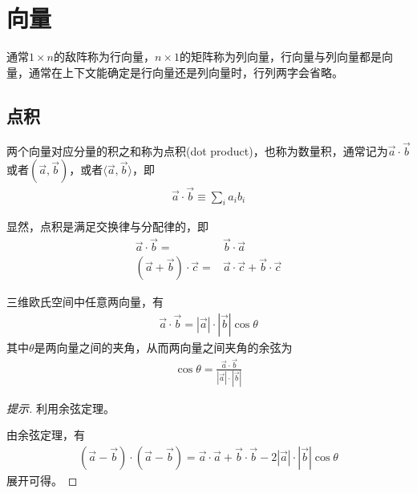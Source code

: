 \section{向量}
\label{sec:vector}

通常$1\times n$的敌阵称为行向量，$n\times 1$的矩阵称为列向量，行向量与列向量都是向量，通常在上下文能确定是行向量还是列向量时，行列两字会省略。

\subsection{点积}
\label{sec:dot-product-of-vector}
\begin{definition}
  两个向量对应分量的积之和称为点积(dot product)，也称为数量积，通常记为$\vec a\cdot\vec b$或者$(\vec a,\vec b)$，或者$\langle\vec a,\vec b\rangle$，即
  \begin{align*}
    \vec{a}\cdot \vec b\equiv\sum_i a_ib_i
  \end{align*}
\end{definition}

显然，点积是满足交换律与分配律的，即
\begin{align*}
  \vec a\cdot \vec b={}&\vec b\cdot \vec a\\
  (\vec a + \vec b)\cdot \vec c ={}& \vec a\cdot \vec c + \vec b\cdot \vec c
\end{align*}

\begin{theorem}
  三维欧氏空间中任意两向量，有
  \begin{align*}
    \vec{a}\cdot \vec b=\left|\vec a\right| \cdot \left|\vec b\right| \cos\theta
  \end{align*}
  其中$\theta$是两向量之间的夹角，从而两向量之间夹角的余弦为
  \begin{align*}
    \cos\theta = \frac{\vec a\cdot \vec b}{\left|\vec a\right| \cdot \left|\vec b\right|}
  \end{align*}
\end{theorem}
\begin{proof}[提示]
  利用余弦定理。
  \begin{center}
  \end{center}
  由余弦定理，有
  \begin{align*}
    (\vec a-\vec b)\cdot(\vec a-\vec b) = \vec a\cdot \vec a + \vec b\cdot\vec b
    - 2\left|\vec a\right|\cdot\left|\vec b\right|\cos\theta
  \end{align*}
  展开可得。
\end{proof}

